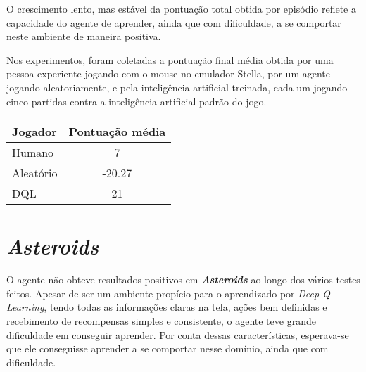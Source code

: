 
O crescimento lento, mas estável da pontuação total obtida por episódio reflete a capacidade do agente de aprender, ainda que com dificuldade, a se comportar neste ambiente de maneira positiva.

Nos experimentos, foram coletadas a pontuação final média obtida por uma pessoa experiente jogando com o mouse no emulador Stella, por um agente jogando aleatoriamente, e pela inteligência artificial treinada, cada um jogando cinco partidas contra a inteligência artificial padrão do jogo.

\begin{center}
\begin{tabular}{l c}
\hline
Jogador & Pontuação média \\
\hline
Humano & 7 \\
Aleatório & -20.27 \\
DQL & 21 \\
\hline
\end{tabular}
\label{table:pong_score}
\end{center}


\section{\textit{Asteroids}}
\label{sec:res_asteroids}
O agente não obteve resultados positivos em \textbf{\textit{Asteroids}} ao longo dos vários testes feitos.
Apesar de ser um ambiente propício para o aprendizado por \textit{Deep Q-Learning}, tendo todas as informações claras na tela, ações bem definidas e recebimento de recompensas simples e consistente, o agente teve grande dificuldade em conseguir aprender.
Por conta dessas características, esperava-se que ele conseguisse aprender a se comportar nesse domínio, ainda que com dificuldade.

